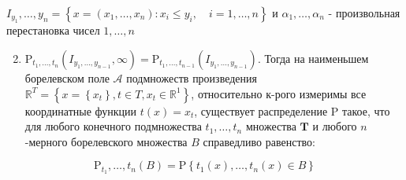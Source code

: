 \documentclass[10pt]{article}
\begin{document}
$I_{y_{1}}, \ldots, y_{n}=\left\{x=\left(x_{1}, \ldots, x_{n}\right): x_{i} \leqslant y_{i}, \quad i=1, \ldots, n\right\}$ и $\alpha_{1}, \ldots, \alpha_{n}$ - произвольная перестановка чисел $1, \ldots, n$



\begin{enumerate}

  \setcounter{enumi}{1}

  \item $\mathrm{P}_{t_{1}, \ldots, t_{n}}\left(I_{y_{1}, \ldots, y_{n-1}}, \infty\right)=\mathrm{P}_{t_{1}, \ldots, t_{n-1}}\left(I_{y_{1}, \ldots, y_{n-1}}\right)$. Тогда на наименьшем борелевском поле $\mathcal{A}$ подмножеств произведения $\mathbb{R}^{T}=\left\{x=\left\{x_{t}\right\}, t \in T, x_{t} \in \mathbb{R}^{1}\right\}$, относительно к-рого измеримы все координатные функции $t(x)=x_{t}$, существует распределение $\mathrm{P}$ такое, что для любого конечного подмножества $t_{1}, \ldots, t_{n}$ множества $\boldsymbol{T}$ и любого $n$-мерного борелевского множества $B$ справедливо равенство:

\end{enumerate}



\[

\mathrm{P}_{t_{1}}, \ldots, t_{n}(B)=\mathrm{P}\left\{t_{1}(x), \ldots, t_{n}(x) \in B\right\}

\]
\end{document}
